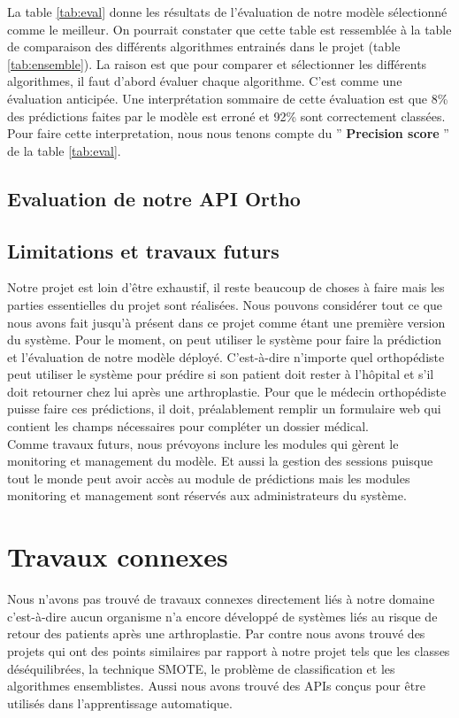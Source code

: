 \documentclass[12pt, french]{report}
\begin{document}
La table \ref{tab:eval} donne les résultats de l'évaluation de notre modèle sélectionné comme le meilleur. On pourrait constater que cette table est ressemblée à la table de comparaison des différents algorithmes entrainés dans le projet (table \ref{tab:ensemble}). La raison est que pour comparer et sélectionner les différents algorithmes, il faut d'abord évaluer chaque algorithme. C'est comme une évaluation anticipée. Une interprétation sommaire de cette évaluation est que 8\% des prédictions faites par le modèle est erroné et 92\% sont correctement classées. Pour faire cette interpretation, nous nous tenons compte du '' \textbf{Precision score} '' de la table \ref{tab:eval}. 

\section{Evaluation de notre API Ortho}

\section{Limitations et travaux futurs}
Notre projet est loin d'être exhaustif, il reste beaucoup de choses à faire mais les parties essentielles du projet sont réalisées. Nous pouvons considérer tout ce que nous avons fait jusqu'à présent dans ce projet comme étant une première version du système. Pour le moment, on peut utiliser le système pour faire la prédiction et l'évaluation de notre modèle déployé. C'est-à-dire n'importe quel orthopédiste peut utiliser le système pour prédire si son patient doit rester à l'hôpital et s'il doit retourner chez lui après une arthroplastie. Pour que le médecin orthopédiste puisse faire ces prédictions, il doit, préalablement remplir un formulaire web qui contient les champs nécessaires pour compléter un dossier médical.   \\

Comme travaux futurs, nous prévoyons inclure les modules qui gèrent le monitoring et management du modèle. Et aussi la gestion des sessions puisque tout le monde peut avoir accès au module de prédictions mais les modules monitoring et management sont réservés aux administrateurs du système.    
\newpage

\chapter{Travaux connexes}
Nous n'avons pas trouvé de travaux connexes directement liés à notre domaine c'est-à-dire aucun organisme n'a encore développé de systèmes liés au risque de retour des patients après une arthroplastie. Par contre nous avons trouvé des projets qui ont des points similaires par rapport à notre projet tels que les classes déséquilibrées, la technique SMOTE, le problème de classification et les algorithmes ensemblistes. Aussi nous avons trouvé des APIs conçus pour être utilisés dans l'apprentissage automatique.\\
\end{document}
